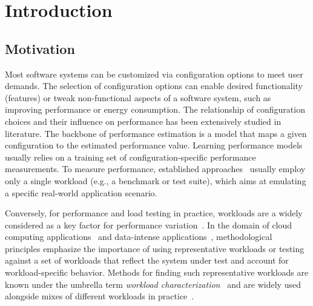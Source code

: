 \section{Introduction}
\subsection*{Motivation}
Most software systems can be customized via configuration options to meet user demands. The selection of configuration options can enable desired functionality (features) or tweak non-functional aspects of a software system, such as improving performance or energy consumption. 
The relationship of configuration choices and their influence on performance has been extensively studied in literature.
The backbone of performance estimation is a model that maps a given configuration to the estimated performance value. 
Learning performance models usually relies on a training set of configuration-specific performance measurements. 
To measure performance, established approaches~\cite{dorn2020,siegmundPerformanceinfluenceModelsHighly2015,haDeepPerf2019,perfAL,guoVariabilityawarePerformancePrediction2013,sarkarCostEfficientSamplingPerformance,guo_2018_data,fourier_learning_2015,perLasso} usually employ only a single workload (e.g., a benchmark or test suite), which aims at emulating a specific real-world application scenario.

Conversely, for performance and load testing in practice, workloads are a widely considered as a key factor for performance variation~\cite{ceesay2020,papadopoulos2021}.
In the domain of cloud computing applications~\cite{papadopoulos2021} and data-intense applications~\cite{ceesay2020}, methodological principles emphasize the importance of using representative workloads or testing against a set of workloads that reflect the system under test and account for workload-specific behavior. Methods for finding such representative workloads are known under the umbrella term \emph{workload characterization}~\cite{calzarossa2016} and are widely used alongside mixes of different workloads in practice~\cite{jiang2015survey}. 


